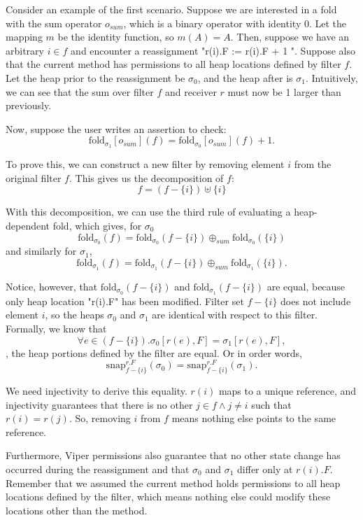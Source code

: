 \documentclass[msc,oneside]{ubcthesis}
\theoremstyle{definition}
\begin{document}
Consider an example of the first scenario. Suppose we are interested in a fold with the sum operator $o_{sum}$, which is a binary operator with identity 0. Let the mapping $m$ be the identity function, so $m(A) = A$. Then, suppose we have an arbitrary $i \in f$ and encounter a reassignment "r(i).F := r(i).F + 1 ". Suppose also that the current method has permissions to all heap locations defined by filter $f$.  Let the heap prior to the reassignment be $\sigma_0$, and the heap after is $\sigma_1$. Intuitively, we can see that the sum over filter $f$ and receiver $r$ must now be 1 larger than previously. 

Now, suppose the user writes an assertion to check:
$$ \textrm{fold}_{\sigma_1}[o_{sum}](f) = \textrm{fold}_{\sigma_0}[o_{sum}](f) + 1.$$

To prove this, we can construct a new filter by removing element $i$ from the original filter $f$. This gives us the decomposition of $f$:
$$f = \left( f - \{i\}\right) \uplus \{i\}$$

With this decomposition, we can use the third rule of evaluating a heap-dependent fold, which gives, for $\sigma_0$
$$\textrm{fold}_{\sigma_0}(f) = \textrm{fold}_{\sigma_0}(f - \{i\}) \oplus_{sum} \textrm{fold}_{\sigma_0}(\{i\})$$ and similarly for $\sigma_1$,
$$\textrm{fold}_{\sigma_1}(f) = \textrm{fold}_{\sigma_1}(f - \{i\}) \oplus_{sum} \textrm{fold}_{\sigma_1}(\{i\}).$$  

Notice, however, that $\textrm{fold}_{\sigma_0}(f - \{i\})$ and $\textrm{fold}_{\sigma_1}(f - \{i\})$ are equal, because only heap location "r(i).F" has been modified. Filter set $f - \{i\}$ does not include element $i$, so the heaps $\sigma_0$ and $\sigma_1$ are identical with respect to this filter. Formally, we know that 
$$\forall e \in \left(f - \{i\}\right). \sigma_0[r(e), F] =  \sigma_1[r(e), F],$$ \ie, the heap portions defined by the filter are equal. Or in order words, $$\textrm{snap}^{r.F}_{f - \{i\}}(\sigma_0) = \textrm{snap}^{r.F}_{f - \{i\}}(\sigma_1).$$

We need injectivity to derive this equality. $r(i)$ maps to a unique reference, and injectivity guarantees that there is no other $j \in f \land j \neq i$ such that $r(i) = r(j)$. So, removing $i$ from $f$ means nothing else points to the same reference.

Furthermore, Viper permissions also guarantee that no other state change has occurred during the reassignment and that $\sigma_0$ and $\sigma_1$ differ only at $r(i).F$. Remember that we assumed the current method holds permissions to all heap locations defined by the filter, which means nothing else could modify these locations other than the method. 
\end{document}
